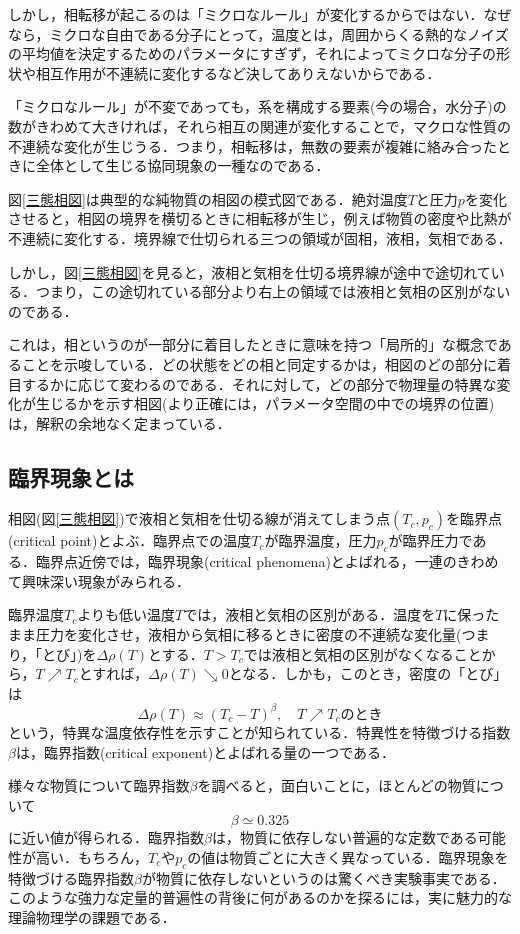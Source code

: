 \documentclass[a4paper,11pt]{jsreport}
\begin{document}
しかし，相転移が起こるのは「ミクロなルール」が変化するからではない．なぜなら，ミクロな自由である分子にとって，温度とは，周囲からくる熱的なノイズの平均値を決定するためのパラメータにすぎず，それによってミクロな分子の形状や相互作用が不連続に変化するなど決してありえないからである．\par
「ミクロなルール」が不変であっても，系を構成する要素(今の場合，水分子)の数がきわめて大きければ，それら相互の関連が変化することで，マクロな性質の不連続な変化が生じうる．つまり，相転移は，無数の要素が複雑に絡み合ったときに全体として生じる協同現象の一種なのである．\par
図\ref{三態相図}は典型的な純物質の相図の模式図である．絶対温度$T$と圧力$p$を変化させると，相図の境界を横切るときに相転移が生じ，例えば物質の密度や比熱が不連続に変化する．境界線で仕切られる三つの領域が固相，液相，気相である．\par
しかし，図\ref{三態相図}を見ると，液相と気相を仕切る境界線が途中で途切れている．つまり，この途切れている部分より右上の領域では液相と気相の区別がないのである．\par
これは，相というのが一部分に着目したときに意味を持つ「局所的」な概念であることを示唆している．どの状態をどの相と同定するかは，相図のどの部分に着目するかに応じて変わるのである．それに対して，どの部分で物理量の特異な変化が生じるかを示す相図(より正確には，パラメータ空間の中での境界の位置)は，解釈の余地なく定まっている．\par

\subsection{臨界現象とは}
相図(図\ref{三態相図})で液相と気相を仕切る線が消えてしまう点$(T_c,p_c)$を臨界点(critical point)とよぶ．臨界点での温度$T_c$が臨界温度，圧力$p_c$が臨界圧力である．臨界点近傍では，臨界現象(critical phenomena)とよばれる，一連のきわめて興味深い現象がみられる．\par
臨界温度$T_c$よりも低い温度$T$では，液相と気相の区別がある．温度を$T$に保ったまま圧力を変化させ，液相から気相に移るときに密度の不連続な変化量(つまり，「とび」)を$\Delta \rho(T)$とする．$T>T_c$では液相と気相の区別がなくなることから，$T \nearrow T_c$とすれば，$\Delta \rho(T) \searrow 0$となる．しかも，このとき，密度の「とび」は
\begin{equation}
  \Delta \rho(T) \approx (T_c -T)^{\beta}, \quad T \nearrow T_c \text{のとき}
\end{equation}
という，特異な温度依存性を示すことが知られている．特異性を特徴づける指数$\beta$は，臨界指数(critical exponent)とよばれる量の一つである．\par
様々な物質について臨界指数$\beta$を調べると，面白いことに，ほとんどの物質について
\begin{equation}
  \beta \simeq 0.325
\end{equation}
に近い値が得られる．臨界指数$\beta$は，物質に依存しない普遍的な定数である可能性が高い．もちろん，$T_c$や$p_c$の値は物質ごとに大きく異なっている．臨界現象を特徴づける臨界指数$\beta$が物質に依存しないというのは驚くべき実験事実である．このような強力な定量的普遍性の背後に何があるのかを探るには，実に魅力的な理論物理学の課題である．
\end{document}
